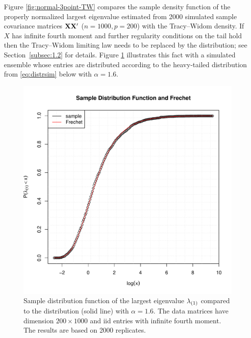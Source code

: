 Figure \ref{fig:normal-3point-TW} compares the sample density function
of the properly normalized largest eigenvalue estimated from 2000 simulated sample covariance matrices ${\mathbf X}{\mathbf X}'$ ($n=1000, p=200$) with
the Tracy--Widom density. If  $X$ has infinite fourth moment and further regularity conditions on the tail hold then the
Tracy--Widom limiting law needs to be replaced by the \Frechet
distribution; see Section~\ref{subsec:1.2} for details. Figure \ref{fig:MyDist-Frechet} illustrates this fact with a
simulated ensemble whose entries are distributed according to
the heavy-tailed distribution from \eqref{eq:distrsim} below with $\alpha = 1.6$.
\begin{figure}[htb!]
  \centering
  \includegraphics[scale=0.5]{MyDist-Frechet.pdf}
  \caption{Sample distribution function of the largest eigenvalue $\lambda_{(1)}$
    compared to the \Frechet distribution (solid line) with $\alpha=1.6$. The data matrices have dimension
    $200 \times 1000$ and iid entries with infinite fourth moment. The results are based on 2000 replicates.}
  \label{fig:MyDist-Frechet}
\end{figure}

